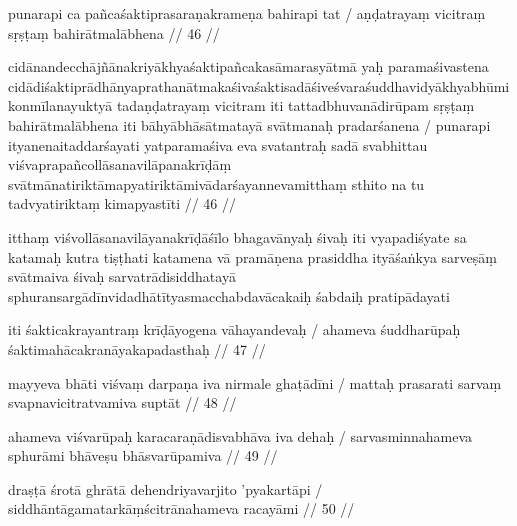punarapi ca pañcaśaktiprasaraṇakrameṇa bahirapi tat  /
aṇḍatrayaṃ vicitraṃ sṛṣṭaṃ bahirātmalābhena  // 46  //

cidānandecchājñānakriyākhyaśaktipañcakasāmarasyātmā yaḥ paramaśivastena cidādiśaktiprādhānyaprathanātmakaśivaśaktisadāśiveśvaraśuddhavidyākhyabhūmikonmīlanayuktyā tadaṇḍatrayaṃ vicitram iti tattadbhuvanādirūpam sṛṣṭaṃ bahirātmalābhena iti bāhyābhāsātmatayā svātmanaḥ pradarśanena  / punarapi ityanenaitaddarśayati yatparamaśiva eva svatantraḥ sadā svabhittau viśvaprapañcollāsanavilāpanakrīḍāṃ svātmānatiriktāmapyatiriktāmivādarśayannevamitthaṃ sthito na tu tadvyatiriktaṃ kimapyastīti  // 46  //

itthaṃ viśvollāsanavilāyanakrīḍāśīlo bhagavānyaḥ śivaḥ iti vyapadiśyate sa katamaḥ kutra tiṣṭhati katamena vā pramāṇena prasiddha ityāśaṅkya sarveṣāṃ svātmaiva śivaḥ sarvatrādisiddhatayā sphuransargādīnvidadhātītyasmacchabdavācakaiḥ śabdaiḥ pratipādayati

iti śakticakrayantraṃ krīḍāyogena vāhayandevaḥ  /
ahameva śuddharūpaḥ śaktimahācakranāyakapadasthaḥ  // 47  //

mayyeva bhāti viśvaṃ darpaṇa iva nirmale ghaṭādīni  /
mattaḥ prasarati sarvaṃ svapnavicitratvamiva suptāt  // 48  //

ahameva viśvarūpaḥ karacaraṇādisvabhāva iva dehaḥ  /
sarvasminnahameva sphurāmi bhāveṣu bhāsvarūpamiva  // 49  //

draṣṭā śrotā ghrātā dehendriyavarjito 'pyakartāpi  /
siddhāntāgamatarkāṃścitrānahameva racayāmi  // 50  //

